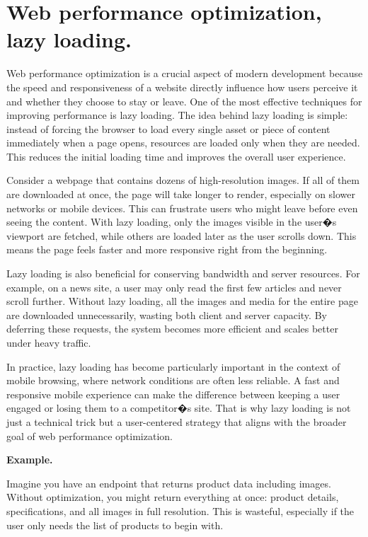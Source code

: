 
\pagebreak

\chapter{Web performance optimization, lazy loading.}


\medskip

Web performance optimization is a crucial aspect of modern development because the speed and responsiveness of a website directly influence how users perceive it and whether they choose to stay or leave. One of the most effective techniques for improving performance is lazy loading. The idea behind lazy loading is simple: instead of forcing the browser to load every single asset or piece of content immediately when a page opens, resources are loaded only when they are needed. This reduces the initial loading time and improves the overall user experience.

Consider a webpage that contains dozens of high-resolution images. If all of them are downloaded at once, the page will take longer to render, especially on slower networks or mobile devices. This can frustrate users who might leave before even seeing the content. With lazy loading, only the images visible in the user�s viewport are fetched, while others are loaded later as the user scrolls down. This means the page feels faster and more responsive right from the beginning.

Lazy loading is also beneficial for conserving bandwidth and server resources. For example, on a news site, a user may only read the first few articles and never scroll further. Without lazy loading, all the images and media for the entire page are downloaded unnecessarily, wasting both client and server capacity. By deferring these requests, the system becomes more efficient and scales better under heavy traffic.

In practice, lazy loading has become particularly important in the context of mobile browsing, where network conditions are often less reliable. A fast and responsive mobile experience can make the difference between keeping a user engaged or losing them to a competitor�s site. That is why lazy loading is not just a technical trick but a user-centered strategy that aligns with the broader goal of web performance optimization.

\medskip

\textbf{Example.}

Imagine you have an endpoint that returns product data including images. Without optimization, you might return everything at once: product details, specifications, and all images in full resolution. This is wasteful, especially if the user only needs the list of products to begin with.

